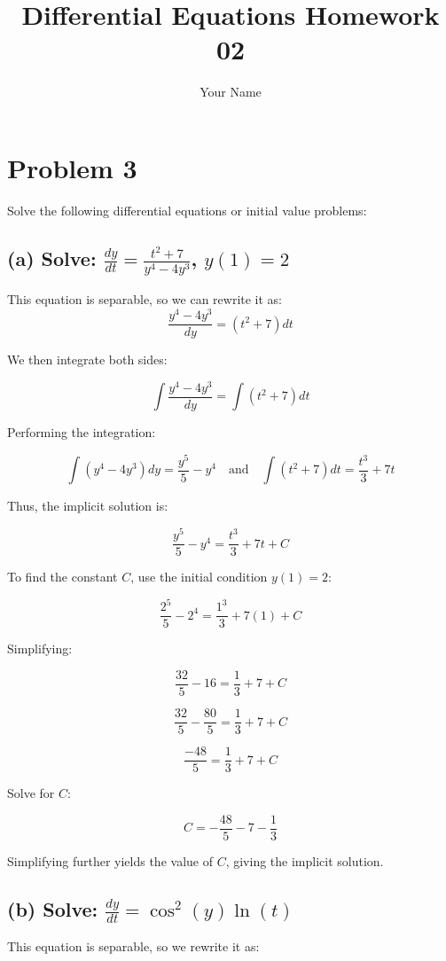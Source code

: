 \documentclass{article}
\title{Differential Equations Homework 02}
\author{Your Name}
\date{}
\begin{document}
\maketitle

\section*{Problem 3}

Solve the following differential equations or initial value problems:

\subsection*{(a) Solve: $\frac{dy}{dt} = \frac{t^2 + 7}{y^4 - 4y^3}$, $y(1) = 2$}

This equation is separable, so we can rewrite it as:
\[
\frac{y^4 - 4y^3}{dy} = (t^2 + 7) dt
\]

We then integrate both sides:

\[
\int \frac{y^4 - 4y^3}{dy} = \int (t^2 + 7) dt
\]

Performing the integration:

\[
\int (y^4 - 4y^3) dy = \frac{y^5}{5} - y^4 \quad \text{and} \quad \int (t^2 + 7) dt = \frac{t^3}{3} + 7t
\]

Thus, the implicit solution is:

\[
\frac{y^5}{5} - y^4 = \frac{t^3}{3} + 7t + C
\]

To find the constant $C$, use the initial condition $y(1) = 2$:

\[
\frac{2^5}{5} - 2^4 = \frac{1^3}{3} + 7(1) + C
\]

Simplifying:

\[
\frac{32}{5} - 16 = \frac{1}{3} + 7 + C
\]

\[
\frac{32}{5} - \frac{80}{5} = \frac{1}{3} + 7 + C
\]

\[
\frac{-48}{5} = \frac{1}{3} + 7 + C
\]

Solve for $C$:

\[
C = -\frac{48}{5} - 7 - \frac{1}{3}
\]

Simplifying further yields the value of $C$, giving the implicit solution.

\subsection*{(b) Solve: $\frac{dy}{dt} = \cos^2(y) \ln(t)$}

This equation is separable, so we rewrite it as:
\end{document}
